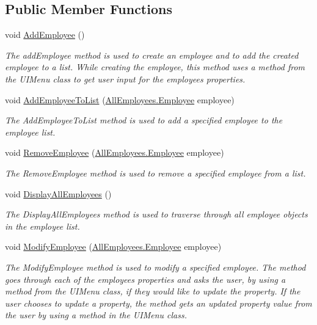 \subsection*{Public Member Functions}
\begin{DoxyCompactItemize}
\item 
void \hyperlink{class_the_company_1_1_container_a5f7b06d8c706d98dd89d337c00c29d97}{Add\+Employee} ()
\begin{DoxyCompactList}\small\item\em The add\+Employee method is used to create an employee and to add the created employee to a list. While creating the employee, this method uses a method from the U\+I\+Menu class to get user input for the employee\textquotesingle{}s properties. \end{DoxyCompactList}\item 
void \hyperlink{class_the_company_1_1_container_a02df30318efe4c62e6c815f06719d886}{Add\+Employee\+To\+List} (\hyperlink{class_all_employees_1_1_employee}{All\+Employees.\+Employee} employee)
\begin{DoxyCompactList}\small\item\em The Add\+Employee\+To\+List method is used to add a specified employee to the employee list. \end{DoxyCompactList}\item 
void \hyperlink{class_the_company_1_1_container_a83e3bd47b7d2b1a89fc87e70f8fb9082}{Remove\+Employee} (\hyperlink{class_all_employees_1_1_employee}{All\+Employees.\+Employee} employee)
\begin{DoxyCompactList}\small\item\em The Remove\+Employee method is used to remove a specified employee from a list. \end{DoxyCompactList}\item 
void \hyperlink{class_the_company_1_1_container_a4ae3d96ffff3765f4b1f01314fbb4f45}{Display\+All\+Employees} ()
\begin{DoxyCompactList}\small\item\em The Display\+All\+Employees method is used to traverse through all employee objects in the employee list. \end{DoxyCompactList}\item 
void \hyperlink{class_the_company_1_1_container_abe4c2da087834fa62e80fe6457eba47d}{Modify\+Employee} (\hyperlink{class_all_employees_1_1_employee}{All\+Employees.\+Employee} employee)
\begin{DoxyCompactList}\small\item\em The Modify\+Employee method is used to modify a specified employee. The method goes through each of the employee\textquotesingle{}s properties and asks the user, by using a method from the U\+I\+Menu class, if they would like to update the property. If the user chooses to update a property, the method gets an updated property value from the user by using a method in the U\+I\+Menu class. \end{DoxyCompactList}\item 

\end{DoxyCompactItemize}
